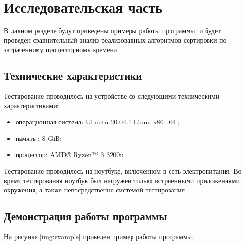 \chapter{Исследовательская часть}

В данном разделе будут приведены примеры работы программы, и будет проведен сравнительный анализ реализованных алгоритмов сортировки по затраченному процессорному времени.

\section{Технические характеристики}

Тестирование проводилось на устройстве со следующими техническими характеристиками:

\begin{itemize}
	\item операционная система: Ubuntu 20.04.1 Linux x86\_64 \cite{linux};
	\item память : 8 GiB;
	\item процессор: AMD® Ryzen™ 3 3200u \cite{amd}.
\end{itemize}

Тестирование проводилось на ноутбуке, включенном в сеть электропитания. Во время тестирования ноутбук был нагружен только встроенными приложениями окружения, а также непосредственно системой тестирования.

\clearpage

\section{Демонстрация работы программы}

На рисунке \ref{img:example} приведен пример работы программы.

